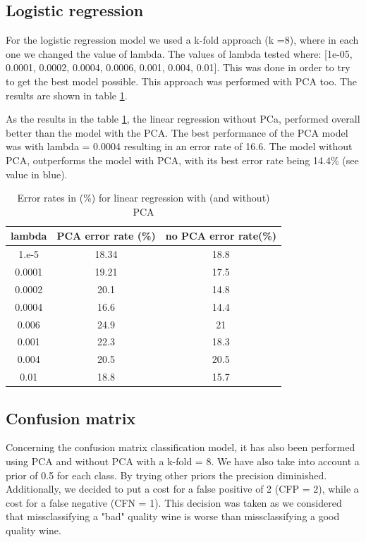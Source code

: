 \documentclass[twoside,a4paper,12pt]{report}
\begin{document}
\subsection{Logistic regression}
For the logistic regression model we used  a k-fold approach (k =8), where in each 
one we changed the value of lambda. The values of lambda tested where: 
[1e-05, 0.0001, 0.0002, 0.0004, 0.0006, 0.001, 0.004, 0.01]. 
This was done in order to try to get the best model possible.
 This approach was performed with PCA too.
The results are shown in table \ref{errorRateslinearregression}.


As the results in the table \ref{errorRateslinearregression}, the linear regression
without PCa, performed overall better than the model with the PCA.
The best performance of the PCA model was with lambda = 0.0004 
resulting in an error rate of 16.6. The model without PCA, outperforms the model 
with PCA, with its best error rate being 14.4\% (see value in blue).

\begin{table}
    \centering
     \begin{tabular}{||c c c ||} 
        \hline \hline
        lambda & PCA error rate (\%) & no PCA error rate(\%)\\
        \hline\hline
        1.e-5  & 18.34  & 18.8   \\ 
        \hline
        0.0001 & 19.21  &  17.5  \\ 
        \hline
        0.0002 & 20.1  &  14.8  \\ 
        \hline
        0.0004 & 16.6  &  \cellcolor{blue!25}  14.4  \\ 
        \hline
        0.006  & 24.9  & 21    \\ 
        \hline
        0.001  & 22.3  &  18.3  \\ 
        \hline
        0.004 & 20.5  &  20.5  \\ 
        \hline
        0.01  &  18.8 & 15.7   \\ 
        \hline \hline
    \end{tabular}
    \caption{Error rates in (\%) for linear regression with (and without) PCA     \label{errorRateslinearregression}
    }
    \end{table}


\subsection{Confusion matrix}
Concerning the confusion matrix classification model, it has also been performed 
using PCA and without PCA with a k-fold = 8.
We have also take into account a prior of 0.5 for each class. By trying other priors
the precision diminished. 
Additionally, we decided to put a cost for a false positive of 2 (CFP = 2), while a cost
for a false negative (CFN = 1). This decision was taken as we considered
that missclassifying a "bad" quality wine is worse than missclassifying a 
good quality wine.
\end{document}
